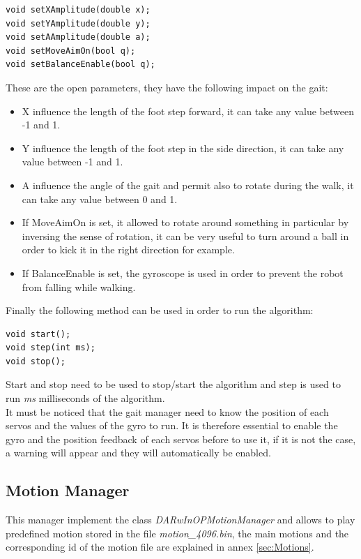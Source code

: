 \documentclass[a4paper, 12pt]{article}  		%
\begin{document}
\lstset{language=c++} 
\lstset{commentstyle=\textit} 
\begin{lstlisting} 
void setXAmplitude(double x);
void setYAmplitude(double y);
void setAAmplitude(double a);
void setMoveAimOn(bool q);
void setBalanceEnable(bool q);
\end{lstlisting}

These are the open parameters, they have the following impact on the gait:\\
\begin{itemize}
\item X influence the length of the foot step forward, it can take any value between -1 and 1.
\item Y influence the length of the foot step in the side direction, it can take any value between -1 and 1.
\item A influence the angle of the gait and permit also to rotate during the walk, it can take any value between 0 and 1.
\item If MoveAimOn is set, it allowed to rotate around something in particular by inversing the sense of rotation, it can be very useful to turn around a ball in order to kick it in the right direction for example.
\item If BalanceEnable is set, the gyroscope is used in order to prevent the robot from falling while walking.
\end{itemize}

Finally the following method can be used in order to run the algorithm:\\
\lstset{language=c++} 
\lstset{commentstyle=\textit} 
\begin{lstlisting} 
void start();
void step(int ms);
void stop();
\end{lstlisting}
Start and stop need to be used to stop/start the algorithm and step is used to run \textit{ms} milliseconds of the algorithm.\\

It must be noticed that the gait manager need to know the position of each servos and the values of the gyro to run. It is therefore essential to enable the gyro and the position feedback of each servos before to use it, if it is not the case, a warning will appear and they will automatically be enabled.\\

\subsection{Motion Manager}
This manager implement the class \textit{DARwInOPMotionManager} and allows to play predefined motion stored in the file \textit{motion\_4096.bin}, the main motions and the corresponding id of the motion file are explained in annex \ref{sec:Motions}.\\
\end{document}
